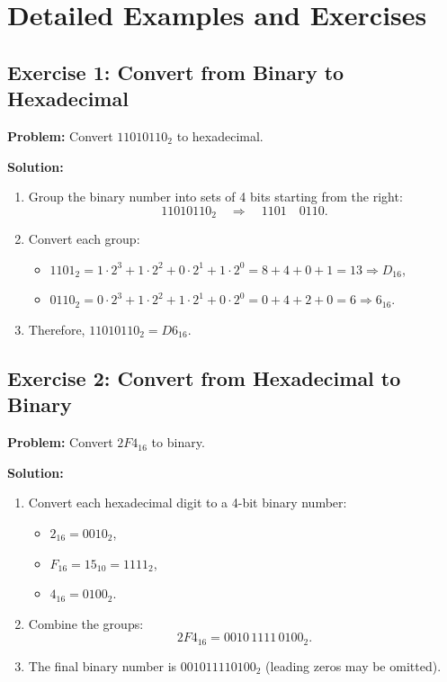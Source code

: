 \documentclass[12pt,a4paper]{article}
\begin{document}
\section{Detailed Examples and Exercises}

\subsection{Exercise 1: Convert from Binary to Hexadecimal}
\textbf{Problem:} Convert \(11010110_2\) to hexadecimal.

\textbf{Solution:}
\begin{enumerate}
    \item Group the binary number into sets of 4 bits starting from the right:
    \[
    11010110_2 \quad \Rightarrow \quad 1101 \quad 0110.
    \]
    \item Convert each group:
    \begin{itemize}
        \item \(1101_2 = 1\cdot2^3+1\cdot2^2+0\cdot2^1+1\cdot2^0 = 8+4+0+1 = 13 \Rightarrow D_{16}\),
        \item \(0110_2 = 0\cdot2^3+1\cdot2^2+1\cdot2^1+0\cdot2^0 = 0+4+2+0 = 6 \Rightarrow 6_{16}\).
    \end{itemize}
    \item Therefore, \(11010110_2 = D6_{16}\).
\end{enumerate}

\subsection{Exercise 2: Convert from Hexadecimal to Binary}
\textbf{Problem:} Convert \(2F4_{16}\) to binary.

\textbf{Solution:}
\begin{enumerate}
    \item Convert each hexadecimal digit to a 4-bit binary number:
    \begin{itemize}
        \item \(2_{16} = 0010_2\),
        \item \(F_{16} = 15_{10} = 1111_2\),
        \item \(4_{16} = 0100_2\).
    \end{itemize}
    \item Combine the groups:
    \[
    2F4_{16} = 0010\,1111\,0100_2.
    \]
    \item The final binary number is \(001011110100_2\) (leading zeros may be omitted).
\end{enumerate}
\end{document}

